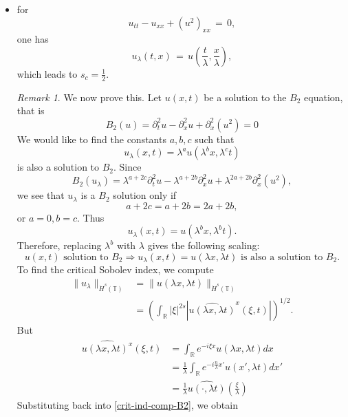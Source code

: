 \documentclass[12pt,reqno]{amsart}
\numberwithin{equation}{section}  %
\numberwithin{figure}{section}
\newcommand{\rr}{\mathbb{R}}
\newcommand{\ci}{\mathbb{T}}
\newcommand{\wh}{\widehat}
\theoremstyle{plain}
\theoremstyle{definition}
\theoremstyle{remark}
\newtheorem{remark}{Remark}
\begin{document}
\begin{itemize}
  \item for 
    \[
    u_{tt}-u_{xx}+(u^2)_{xx}\,=\,0,
    \]
    one has 
    \[
    u_{\lambda}(t,x)\,=\,u\left(\frac{t}{\lambda}, \frac{x}{\lambda}\right),
    \]
    which leads to $s_c=\frac 12$.
\begin{framed}
\begin{remark}
We now prove this. 
Let $u(x, t)$ be a solution to the $B_2$ equation, that is
%
$$
B_2(u)=
 \partial_t^2u - \partial^2_x u + \partial_x^2(u^2)  = 0
$$
%
We would like to find the constants
$a, b, c$ such that
\[
u_\lambda (x, t) = \lambda^a u(\lambda^b x, \lambda^c t)
\]
is also a solution to $B_2$.  Since 
$$
B_2(u_\lambda)=
\lambda^{a+2c} \partial_t^2u 
-
 \lambda^{a+2b} \partial^2_x u 
 +
  \lambda^{2a+2b}
  \partial_x^2(u^2),  
$$
we see that $u_\lambda$ is a $B_2$ solution only if
$$
a+2c=a+2b=2a+2b,
$$
or
$
a=0, b=c.
$
  Thus
\[
u_\lambda (x, t) = u(\lambda^{b}x,  \lambda^{b} t).
\]
%
%
Therefore, replacing  $ \lambda^b$ with  $ \lambda$ gives the following scaling:
%
\begin{equation}
\label{B2-scal}
\boxed{
u(x, t) \text{ solution to }  B_2
 \Longrightarrow 
u_\lambda (x, t) = u(\lambda x, \lambda t)  \text { is also a
solution to }  B_2. 
}
\end{equation}
  \label{rem:scaling-B2}
To find the critical Sobolev index, we compute
\\
%
%
\begin{equation}
\begin{split}
  \| u_{\lambda} \|_{\dot{H}^s(\ci)} 
  & =  \| u(\lambda x, \lambda t) \|_{\dot{H}^{s}(\ci)}
  \\
  & = \left( \int_{\rr} | \xi |^{2s} | \wh{u(\lambda x,
  \lambda t)}^x (\xi, t)| \right)^{1/2}.
\end{split}
\label{crit-ind-comp-B2}
\end{equation}
%
But
%
\\
%
\begin{equation*}
\begin{split}
  \wh{u(\lambda x, \lambda t)^x}(\xi, t)
  & = \int_{\rr}e^{-i\xi x}u(\lambda x, \lambda t) dx
  \\
  & = \frac{1}{\lambda} \int_{\rr}e^{-i \frac{n}{\lambda} x'}u(x',
  \lambda t) dx'
  \\
  & = \frac{1}{\lambda} \wh{u(\cdot, \lambda t)}(\frac{\xi}{\lambda})
\end{split}
\end{equation*}
%
%
Substituting back into \eqref{crit-ind-comp-B2}, we obtain
%
%
\begin{equation*}

\end{equation*}
\end{remark}
\end{framed}
\end{itemize}
\end{document}
